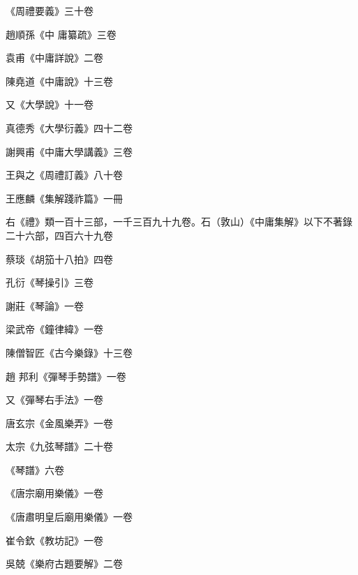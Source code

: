 \begin{pinyinscope}
 《周禮要義》三十卷



 趙順孫《中
 庸纂疏》三卷



 袁甫《中庸詳說》二卷



 陳堯道《中庸說》十三卷



 又《大學說》十一卷



 真德秀《大學衍義》四十二卷



 謝興甫《中庸大學講義》三卷



 王與之《周禮訂義》八十卷



 王應麟《集解踐祚篇》一冊



 右《禮》類一百十三部，一千三百九十九卷。石（敦山）《中庸集解》以下不著錄二十六部，四百六十九卷



 蔡琰《胡笳十八拍》四卷



 孔衍《琴操引》三卷



 謝莊《琴論》一卷



 梁武帝《鐘律緯》一卷



 陳僧智匠《古今樂錄》十三卷



 趙
 邦利《彈琴手勢譜》一卷



 又《彈琴右手法》一卷



 唐玄宗《金風樂弄》一卷



 太宗《九弦琴譜》二十卷



 《琴譜》六卷



 《唐宗廟用樂儀》一卷



 《唐肅明皇后廟用樂儀》一卷



 崔令欽《教坊記》一卷



 吳兢《樂府古題要解》二卷




\end{pinyinscope}

